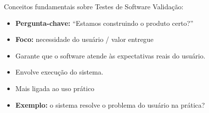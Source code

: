 \begin{frame}{Conceitos fundamentais sobre Testes de Software}
    Validação:
    \begin{itemize}
        \item \textbf{Pergunta-chave:}  “Estamos construindo o produto certo?”
        \item \textbf{Foco:} necessidade do usuário / valor entregue
        \item Garante que o software atende às expectativas reais do usuário.
        \item Envolve execução do sistema.
        \item Mais ligada ao uso prático
        \item \textbf{Exemplo:} o sistema resolve o problema do usuário na prática?
    \end{itemize}
\end{frame}